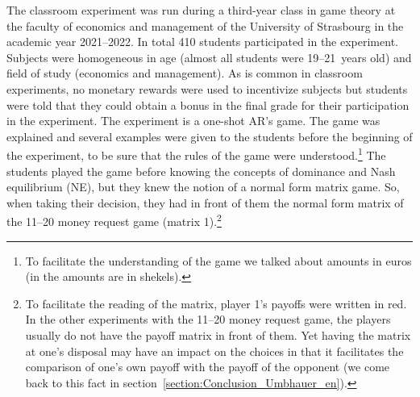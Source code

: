 \begin{Article}
\begin{refsection}[Umbhauer]
The classroom experiment was run during a third-year class in game
theory at the faculty of economics and management of the University of
Strasbourg in the academic year 2021--2022. In total 410 students
participated in the experiment. Subjects were homogeneous in age (almost
all students were 19--21~years old) and field of study (economics and
management). As is common in classroom experiments, no monetary rewards
were used to incentivize subjects but students were told that they could
obtain a bonus in the final grade for their participation in the
experiment. The experiment is a one-shot AR's game. The game was
explained and several examples were given to the students before the
beginning of the experiment, to be sure that the rules of the game were
understood.\footnote{To facilitate the understanding of the game we
  talked about amounts in euros (in \textcite{arad2012} the amounts are in
  shekels).} The students played the game before knowing the concepts of
dominance and Nash equilibrium (NE), but they knew the notion of a
normal form matrix game. So, when taking their decision, they had in
front of them the normal form matrix of the 11--20 money request game
(matrix 1).\footnote{To facilitate the reading of the matrix, player 1's
  payoffs were written in red. In the other experiments with the 11--20
  money request game, the players usually do not have the payoff matrix
  in front of them. Yet having the matrix at one's disposal may have an
  impact on the choices in that it facilitates the comparison of one's
  own payoff with the payoff of the opponent (we come back to this fact
  in section~\ref{section:Conclusion_Umbhauer_en}).}


\end{refsection}
\end{Article}
